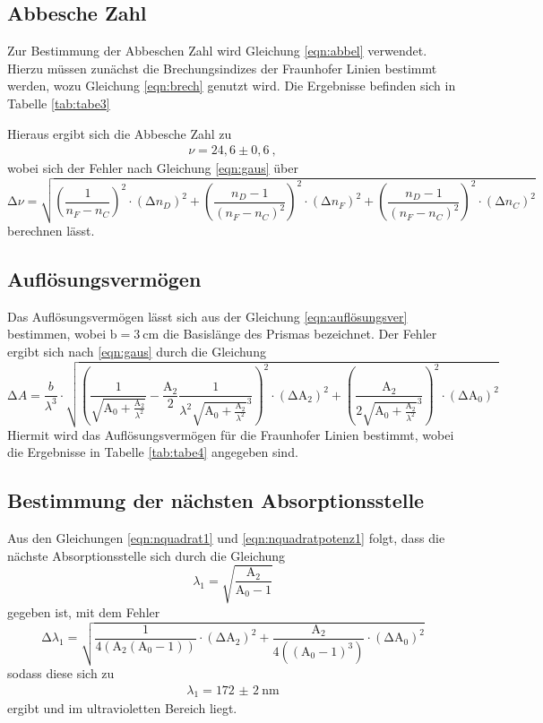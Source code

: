 \subsection{Abbesche Zahl}
Zur Bestimmung der Abbeschen Zahl wird Gleichung \ref{eqn:abbel} verwendet.
Hierzu müssen zunächst die Brechungsindizes der Fraunhofer Linien bestimmt werden,
wozu Gleichung \ref{eqn:brech} genutzt wird. Die Ergebnisse befinden sich in Tabelle
\ref{tab:tabe3}

Hieraus ergibt sich die Abbesche Zahl zu
\begin{align}
  \nu = 24,6 \pm 0,6 \: ,
\end{align}
wobei sich der Fehler nach Gleichung \ref{eqn:gaus} über
\begin{equation}
  \increment \nu = \sqrt{\left(\frac{1}{n_F-n_C} \right)^2 \cdot (\increment n_D)^2
  + \left(\frac{n_D-1}{(n_F-n_C)^2} \right)^2 \cdot (\increment n_F)^2
  + \left(\frac{n_D-1}{(n_F-n_C)^2} \right)^2 \cdot (\increment n_C)^2}
\end{equation}
berechnen lässt.

\subsection{Auflösungsvermögen}
Das Auflösungsvermögen lässt sich aus der Gleichung \ref{eqn:auflösungsver}
bestimmen, wobei $\text{b}=\SI{3}{\centi\meter}$ die Basislänge des Prismas
bezeichnet.
Der Fehler ergibt sich nach \ref{eqn:gaus} durch die Gleichung
\begin{equation}
  \increment A = \frac{b}{\lambda^3}\cdot \sqrt{\left( \frac{1}{\sqrt{\text{A}_0
  +\frac{\text{A}_2}{\lambda^2}}}-\frac{\text{A}_2}{2}\frac{1}{\lambda^2
  \sqrt{\text{A}_0 + \frac{\text{A}_2}{\lambda^2}}^3}\right)^2 \cdot (\increment \text{A}_2)^2
  + \left(\frac{\text{A}_2}{2
  \sqrt{\text{A}_0 + \frac{\text{A}_2}{\lambda^2}}^3}\right)^2 \cdot (\increment \text{A}_0)^2}
\end{equation}
Hiermit wird das Auflösungsvermögen für die Fraunhofer Linien bestimmt, wobei die
Ergebnisse in Tabelle \ref{tab:tabe4} angegeben sind.


\subsection{Bestimmung der nächsten Absorptionsstelle}
Aus den Gleichungen \ref{eqn:nquadrat1} und \ref{eqn:nquadratpotenz1} folgt, dass die nächste Absorptionsstelle sich durch die
Gleichung
\begin{equation}
  \lambda_1 = \sqrt{\frac{\text{A}_2}{\text{A}_0-1}}
\end{equation}
gegeben ist, mit dem Fehler
\begin{equation}
  \increment \lambda_1 =\sqrt{\frac{1}{4(\text{A}_2(\text{A}_0-1))} \cdot (\increment
  \text{A}_2)^2 + \frac{\text{A}_2}{4((\text{A}_0-1)^3)} \cdot (\increment
  \text{A}_0)^2  }
\end{equation}
sodass diese sich zu
\begin{align*}
    \lambda_1 = \SI{172(2)}{\nano\meter}
\end{align*}
ergibt und im ultravioletten Bereich liegt.
